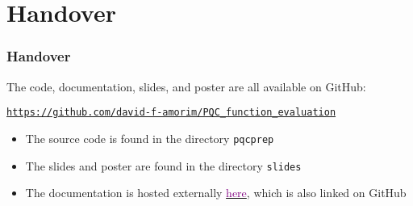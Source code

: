 \documentclass{beamer}
\begin{document}
\section{Handover}

\begin{frame}

\frametitle{Handover}

The code, documentation, slides, and poster are all available on GitHub:
\begin{center}
\vspace{0.6cm}
\href{https://github.com/david-f-amorim/PQC_function_evaluation}{\texttt{https://github.com/david-f-amorim/PQC\_function\_evaluation}}
\vspace{0.6cm}
\end{center}

\begin{itemize}
\item The source code is found in the directory \alert{\texttt{pqcprep}} 
\item The slides and poster are found in the directory \alert{\texttt{slides}}
\item The documentation is hosted externally  \href{https://david-f-amorim.github.io/PQC_function_evaluation/pqcprep.html}{\textcolor{purple}{here}}, which is also linked on GitHub
\end{itemize}

\end{frame}
\end{document}
